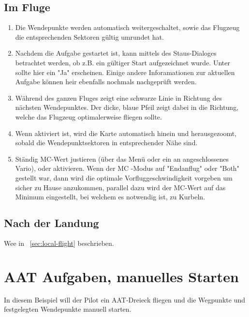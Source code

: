 \subsection*{Im Fluge}
\begin{enumerate}
\item  Die Wendepunkte werden automatisch weitergeschaltet, sowie das Flugzeug die entsprechenden
Sektoren gültig umrundet hat.
\item Nachdem die Aufgabe  gestartet ist, kann  mittels des Staus-Dialoges betrachtet werden, ob z.B. ein
gültiger Start aufgezeichnet wurde.
Unter  sollte hier ein  "Ja" erscheinen.
Einige andere Inforamationen zur aktuellen Aufgabe können heir ebenfalls nochmals nachgeprüft werden.
\item Während des ganzen Fluges zeigt eine schwarze Linie in Richtung des nächsten Wendepunktes.
Der dicke, blaue Pfeil zeigt dabei in die Richtung, welche das Flugzeug optimalerweise fliegen sollte.
\item  Wenn  aktiviert ist, wird die Karte automatisch hinein und herausgezoomt,
sobald die Wendepunktsektoren in entsprechender Nähe sind.
\item  Ständig MC-Wert justieren (über das Menü oder ein an \xc angeschlossenes Vario), oder  aktivieren.
Wenn der MC -Modus auf "Endanflug" oder "Both" gestellt war, dann wird \xc die optimale
Vorfluggeschwindigkeit vorgeben um sicher zu Hause anzukommen, parallel dazu wird der MC-Wert auf
das Minimum eingestellt, bei welchem es notwendig ist, zu Kurbeln.
\end{enumerate}

\subsection*{Nach der Landung}
Wee in ~\ref{sec:local-flight} beschrieben.


\section{AAT Aufgaben, manuelles Starten}\label{sec:aat-task-manual}

In diesem Beispiel will der Pilot ein AAT-Dreieck fliegen und die Wegpunkte
und festgelegten Wendepunkte manuell starten.

